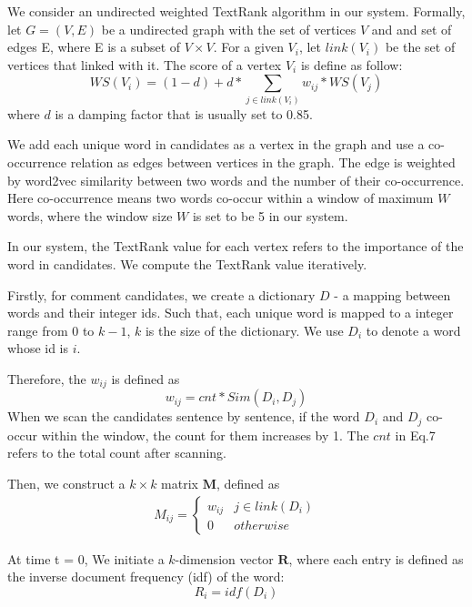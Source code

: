 \documentclass{sig-alternate}
\begin{document}
We consider an undirected weighted TextRank algorithm in our system. 
Formally, let $G = (V, E)$ be a undirected graph with the set of vertices $V$ and 
and set of edges E, where E is a subset of $V \times V$. For a given $V_i$, let 
$link(V_i)$ be the set of vertices that linked with it. The score of a vertex 
$V_i$ is define as follow:
\begin{equation}
  WS(V_i) = (1 - d) + d * \sum_{j \in link(V_i)}{w_{ij} * WS(V_j)}
\end{equation}
where $d$ is a damping factor\cite {Brin} that is usually set to 0.85.

We add each unique word in candidates as a vertex in the graph and use a 
co-occurrence relation as edges between vertices in the graph. The edge is 
weighted by word2vec similarity between two words and the number of their 
co-occurrence. Here co-occurrence means two words co-occur within a window of 
maximum $W$ words, where the window size $W$ is set to be 5 in our system.

In our system, the TextRank value for each vertex refers to the importance of 
the word in candidates. We compute the TextRank value iteratively.

Firstly, for comment candidates, we create a dictionary $D$ - a mapping between words 
and their integer ids. Such that, each unique word is mapped to a integer range 
from $0$ to $k-1$, $k$ is the size of the dictionary. We use $D_i$ to denote a 
word whose id is $i$.

Therefore, the $w_{ij}$ is defined as
\begin{equation}
  w_{ij} = cnt * Sim(D_i, D_j)
\end{equation}
When we scan the candidates sentence by sentence, if the word $D_i$ and $D_j$ 
co-occur within the window, the count for them increases by 1. The $cnt$ in Eq.7 
refers to the total count after scanning.

Then, we construct a $k \times k$ matrix $\bm{M}$, defined as
\begin{equation}
  \begin{aligned}
    M_{ij} = \begin{cases} 
             w_{ij} & j \in link(D_i) \\
             0 & otherwise
             \end{cases}
  \end{aligned}
\end{equation}

At time t = 0, We initiate a $k$-dimension vector $\bm{R}$, where each entry is defined as the inverse document frequency (idf) of the word: 
\begin{equation}
  R_i = idf(D_i)
\end{equation}
\end{document}
